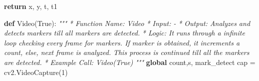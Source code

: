 \documentclass[]{article}
\newenvironment{Shaded}{}{}
\newcommand{\KeywordTok}[1]{\textcolor[rgb]{0.00,0.44,0.13}{\textbf{{#1}}}}
\newcommand{\DecValTok}[1]{\textcolor[rgb]{0.25,0.63,0.44}{{#1}}}
\newcommand{\CommentTok}[1]{\textcolor[rgb]{0.38,0.63,0.69}{\textit{{#1}}}}
\newcommand{\VariableTok}[1]{\textcolor[rgb]{0.10,0.09,0.49}{{#1}}}
\newcommand{\ControlFlowTok}[1]{\textcolor[rgb]{0.00,0.44,0.13}{\textbf{{#1}}}}
\newcommand{\OperatorTok}[1]{\textcolor[rgb]{0.40,0.40,0.40}{{#1}}}
\newcommand{\NormalTok}[1]{{#1}}
\begin{document}
\begin{Shaded}
\begin{Highlighting}[]
    \ControlFlowTok{return} \NormalTok{x, y, t, t1}


\KeywordTok{def} \NormalTok{Video(}\VariableTok{True}\NormalTok{):}
    \CommentTok{"""}
\CommentTok{    * Function Name:    Video}
\CommentTok{    * Input:        -}
\CommentTok{    * Output:           Analyzes and detects markers till all markers are}
\CommentTok{                        detected.}
\CommentTok{    * Logic:        It runs through a infinite loop checking}
\CommentTok{                        every frame for markers. If marker is obtained,}
\CommentTok{                        it increments a count, else, next frame is analyzed.}
\CommentTok{                        This process is continued till all the markers are}
\CommentTok{                        detected.}
\CommentTok{    * Example Call: Video(True)}
\CommentTok{    """}
    \KeywordTok{global} \NormalTok{count,s, mark_detect}
    \NormalTok{cap }\OperatorTok{=} \NormalTok{cv2.VideoCapture(}\DecValTok{1}\NormalTok{)}


\end{Highlighting}
\end{Shaded}
\end{document}
